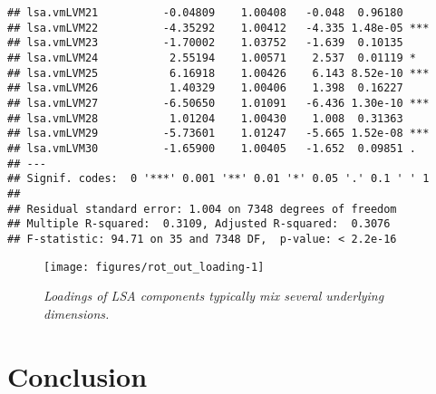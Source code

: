\documentclass[12pt]{article}\usepackage[]{graphicx}\usepackage[]{color}
\makeatletter
\newenvironment{kframe}{%
 \def\at@end@of@kframe{}%
 \ifinner\ifhmode%
  \def\at@end@of@kframe{\end{minipage}}%
  \begin{minipage}{\columnwidth}%
 \fi\fi%
 \def\FrameCommand##1{\hskip\@totalleftmargin \hskip-\fboxsep
 \colorbox{shadecolor}{##1}\hskip-\fboxsep
     \hskip-\linewidth \hskip-\@totalleftmargin \hskip\columnwidth}%
 \MakeFramed {\advance\hsize-\width
   \@totalleftmargin\z@ \linewidth\hsize
   \@setminipage}}%
 {\par\unskip\endMakeFramed%
 \at@end@of@kframe}
\newenvironment{knitrout}{}{} %
\makeatother
\begin{document}
\begin{knitrout}
\begin{kframe}
\begin{verbatim}
## lsa.vmLVM21          -0.04809    1.00408   -0.048  0.96180    
## lsa.vmLVM22          -4.35292    1.00412   -4.335 1.48e-05 ***
## lsa.vmLVM23          -1.70002    1.03752   -1.639  0.10135    
## lsa.vmLVM24           2.55194    1.00571    2.537  0.01119 *  
## lsa.vmLVM25           6.16918    1.00426    6.143 8.52e-10 ***
## lsa.vmLVM26           1.40329    1.00406    1.398  0.16227    
## lsa.vmLVM27          -6.50650    1.01091   -6.436 1.30e-10 ***
## lsa.vmLVM28           1.01204    1.00430    1.008  0.31363    
## lsa.vmLVM29          -5.73601    1.01247   -5.665 1.52e-08 ***
## lsa.vmLVM30          -1.65900    1.00405   -1.652  0.09851 .  
## ---
## Signif. codes:  0 '***' 0.001 '**' 0.01 '*' 0.05 '.' 0.1 ' ' 1
## 
## Residual standard error: 1.004 on 7348 degrees of freedom
## Multiple R-squared:  0.3109,	Adjusted R-squared:  0.3076 
## F-statistic: 94.71 on 35 and 7348 DF,  p-value: < 2.2e-16
\end{verbatim}
\end{kframe}
\end{knitrout}


\begin{figure}
\begin{knitrout}
\color{fgcolor}

{\centering \texttt{[image: figures/rot\_out\_loading-1]} 

}



\end{knitrout}
\caption{  \label{fig:rotoutloading}
  {\sl Loadings of LSA components typically mix several underlying dimensions.}  }
\end{figure}


\section{Conclusion}
\label{sec:disc}
\end{document}
